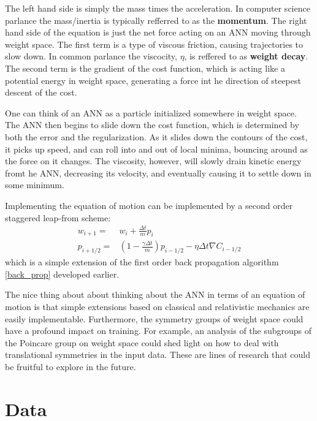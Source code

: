 \documentclass[prl,amsmath,amssymb,floatfix,superscriptaddress,notitlepage,twocolumn]{revtex4}
\newcommand{\ee}[1]{\begin{align} #1 \end{align}} 						%
\begin{document}
The left hand side is simply the mass times the acceleration. In computer science parlance the mass/inertia is typically refferred to as the \textbf{momentum}. The right hand side of the equation is just the net force acting on an ANN moving through weight space. The first term is a type of viscous friction, causing trajectories to slow down. In common parlance the viscocity, $\eta$, is reffered to as \textbf{weight decay}. The second term is the gradient of the cost function, which is acting like a potential energy in weight space, generating a force int he direction of steepest descent of the cost. 

One can think of an ANN as a particle initialized somewhere in weight space. The ANN then begins to slide down the cost function, which is determined by both the error and the regularization. As it slides down the contours of the cost, it picks up speed, and can roll into and out of local minima, bouncing around as the force on it changes. The viscosity, however, will slowly drain kinetic energy fromt he ANN, decreasing its velocity, and eventually causing it to settle down in some minimum. 

Implementing the equation of motion can be implemented by a second order staggered leap-from scheme:
\ee{
w_{i+1}=&w_i+\frac{\Delta t}{m}p_i\\
p_{i+1/2}=&(1-\frac{\gamma\Delta t}{m})p_{i-1/2}-\eta\Delta t \nabla C_{i-1/2}
}
which is a simple extension of the first order back propagation algorithm \ref{back_prop} developed earlier. 

The nice thing about about thinking about the ANN in terms of an equation of motion is that simple extensions based on classical and relativistic mechanics are easily implementable. Furthermore, the symmetry groups of weight space could have a profound impact on training. For example, an analysis of the subgroups of the Poincare group on weight space could shed light on how to deal with translational symmetries in the input data. These are lines of research that could be fruitful to explore in the future. 

\section{Data}
\end{document}
